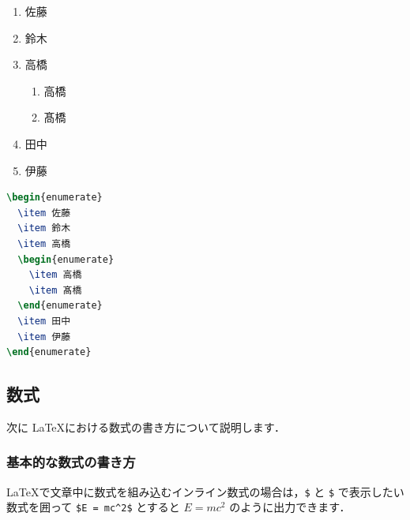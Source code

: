 \documentclass[
    paper=a4paper,      %
    article,            %
    fontsize=11pt,      %
    jafontsize=11pt,    %
    head_space=25mm,    %
    foot_space=25mm,    %
    gutter=20mm,        %
    fore-edge=20mm      %
    ]{jlreq}            %
\begin{document}
\begin{multicols}{2}
  \begin{enumerate}
    \item 佐藤
    \item 鈴木
    \item 高橋
    \begin{enumerate}
      \item 高橋
      \item 髙橋
    \end{enumerate}
    \item 田中
    \item 伊藤
  \end{enumerate}
  \columnbreak
\begin{lstlisting}[language=TeX]
\begin{enumerate}
  \item 佐藤
  \item 鈴木
  \item 高橋
  \begin{enumerate}
    \item 高橋
    \item 髙橋
  \end{enumerate}
  \item 田中
  \item 伊藤
\end{enumerate}
\end{lstlisting}
\end{multicols}

\subsection{数式}
\label{ssec:math}

次に \LaTeX における数式の書き方について説明します．

\subsubsection{基本的な数式の書き方}
\label{sssec:math-basic}

\LaTeX で文章中に数式を組み込むインライン数式の場合は，\verb|$| と \verb|$| で表示したい数式を囲って \verb|$E = mc^2$| とすると $E = mc^2$ のように出力できます．
\end{document}
